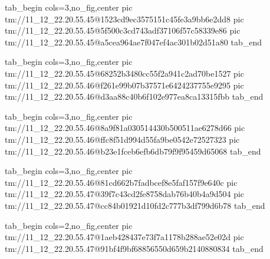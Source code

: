  
 
 
 
 

\qqSecCmtScr


\ifcmt
  tab_begin cols=3,no_fig,center
    pic tm://11_12_22.20.55.45@1523cd9ec3575151c45fe3a9bb6e2dd8
    pic tm://11_12_22.20.55.45@5f500c3cd743adf37106f57c58339e86
    pic tm://11_12_22.20.55.45@a5cea964ae7f047ef4ac301b02d51a80
  tab_end
\fi


\ifcmt
  tab_begin cols=3,no_fig,center
    pic tm://11_12_22.20.55.45@68252b3480cc55f2a941c2ad70be1527
    pic tm://11_12_22.20.55.46@f261e99b07b37571e6424237755e9295
    pic tm://11_12_22.20.55.46@d3aa88c40b6f102e977ea8ca13315fbb
  tab_end
\fi


\ifcmt
  tab_begin cols=3,no_fig,center
    pic tm://11_12_22.20.55.46@8a9f81a030514430b500511ae6278d66
    pic tm://11_12_22.20.55.46@ffc8f51d994d55fa9be0542e72527323
    pic tm://11_12_22.20.55.46@b23e1fceb6efb6db79f9f95459d65068
  tab_end
\fi


\ifcmt
  tab_begin cols=3,no_fig,center
    pic tm://11_12_22.20.55.46@81cd662b7fadbcef8e5faf157f9e640c
    pic tm://11_12_22.20.55.47@39f7c43cd2fe8758dab76b40b4a9d504
    pic tm://11_12_22.20.55.47@cc84b01921d10fd2c777b3df799d6b78
  tab_end
\fi


\ifcmt
  tab_begin cols=2,no_fig,center
    pic tm://11_12_22.20.55.47@1aeb428437e73f7a1178b288ae52e02d
    pic tm://11_12_22.20.55.47@91bf4f9bf68856550d659b2140880834
  tab_end
\fi

